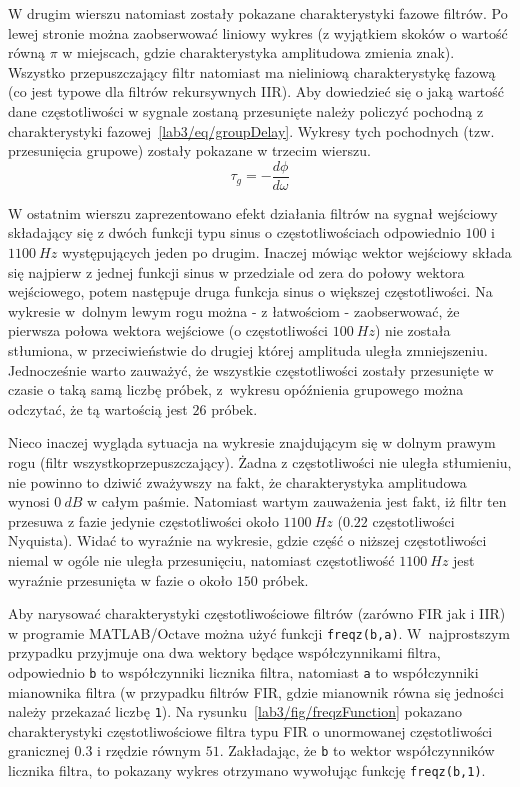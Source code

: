 W drugim wierszu natomiast zostały pokazane charakterystyki fazowe filtrów. Po lewej stronie można zaobserwować liniowy wykres (z wyjątkiem skoków o wartość równą $\pi$ w miejscach, gdzie charakterystyka amplitudowa zmienia znak). Wszystko przepuszczający filtr natomiast ma nieliniową charakterystykę fazową (co jest typowe dla filtrów rekursywnych IIR). Aby dowiedzieć się o jaką wartość dane częstotliwości w sygnale zostaną przesunięte należy policzyć pochodną z charakterystyki fazowej~\ref{lab3/eq/groupDelay}. Wykresy tych pochodnych (tzw. przesunięcia grupowe) zostały pokazane w trzecim wierszu. 
\begin{equation}\label{lab3/eq/groupDelay}
	\tau_g = - \frac{d \phi}{d \omega}
\end{equation}

W ostatnim wierszu zaprezentowano efekt działania filtrów na sygnał wejściowy składający się z dwóch funkcji typu sinus o częstotliwościach odpowiednio $100$ i $1100~Hz$ występujących jeden po drugim. Inaczej mówiąc wektor wejściowy składa się najpierw z jednej funkcji sinus w przedziale od zera do połowy wektora wejściowego, potem następuje druga funkcja sinus o większej częstotliwości. Na wykresie w~dolnym lewym rogu można - z łatwościom - zaobserwować, że pierwsza połowa wektora wejściowe (o częstotliwości $100~Hz$) nie została stłumiona, w przeciwieństwie do drugiej której amplituda uległa zmniejszeniu. Jednocześnie warto zauważyć, że wszystkie częstotliwości zostały przesunięte w czasie o taką samą liczbę próbek, z~wykresu opóźnienia grupowego można odczytać, że tą wartością jest $26$ próbek. 

Nieco inaczej wygląda sytuacja na wykresie znajdującym się w dolnym prawym rogu (filtr wszystkoprzepuszczający). Żadna z częstotliwości nie uległa stłumieniu, nie powinno to dziwić zważywszy na fakt, że charakterystyka amplitudowa wynosi $0~dB$ w całym paśmie. Natomiast wartym zauważenia jest fakt, iż filtr ten przesuwa z fazie jedynie częstotliwości około $1100~Hz$ ($0.22$ częstotliwości Nyquista). Widać to wyraźnie na wykresie, gdzie część o niższej częstotliwości niemal w ogóle nie uległa przesunięciu, natomiast częstotliwość $1100~Hz$ jest wyraźnie przesunięta w fazie o około $150$ próbek.

Aby narysować charakterystyki częstotliwościowe filtrów (zarówno FIR jak i IIR) w programie MATLAB/Octave można użyć funkcji \texttt{freqz(b,a)}. W~najprostszym przypadku przyjmuje ona dwa wektory będące współczynnikami filtra, odpowiednio \texttt{b} to współczynniki licznika filtra, natomiast \texttt{a} to współczynniki mianownika filtra (w przypadku filtrów FIR, gdzie mianownik równa się jedności należy przekazać liczbę \texttt{1}). Na rysunku~\ref{lab3/fig/freqzFunction} pokazano charakterystyki częstotliwościowe filtra typu FIR o unormowanej częstotliwości granicznej $0.3$ i rzędzie równym $51$. Zakładając, że \texttt{b} to wektor współczynników licznika filtra, to pokazany wykres otrzymano wywołując funkcję \texttt{freqz(b,1)}.

